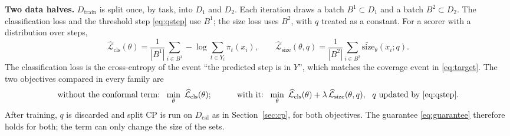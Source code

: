 \documentclass[10pt,a4paper]{article}
\newcommand{\Dtr}{D_{\mathrm{train}}}
\newcommand{\Dcal}{D_{\mathrm{cal}}}
\newcommand{\Lcls}{\widehat{\mathcal L}_{\mathrm{cls}}}
\newcommand{\Lsize}{\widehat{\mathcal L}_{\mathrm{size}}}
\newcommand{\cmt}[1]{\textcolor{purple}{[\textsc{Note:} #1}]}
\begin{document}
\textbf{Two data halves.} $\Dtr$ is split once, by task, into $D_1$ and $D_2$. Each iteration draws a batch $B^1\subset D_1$ and a batch $B^2\subset D_2$. The classification loss and the threshold step \eqref{eq:qstep} use $B^1$; the size loss uses $B^2$, with $q$ treated as a constant. For a scorer with a distribution over steps,
\begin{equation}
\Lcls(\theta)=\frac{1}{|B^1|}\sum_{i\in B^1}-\log\!\sum_{t\in Y_i}\pi_t(x_i),\qquad \Lsize(\theta,q)=\frac{1}{|B^2|}\sum_{i\in B^2}\widetilde{\mathrm{size}}_\theta(x_i;q). \label{eq:losses}
\end{equation}
The classification loss is the cross-entropy of the event ``the predicted step is in $Y$'', which matches the coverage event in \eqref{eq:target}. The two objectives compared in every family are
\begin{equation}
\text{without the conformal term:}\ \ \min_\theta\ \Lcls(\theta);\qquad\quad \text{with it:}\ \ \min_\theta\ \Lcls(\theta)+\lambda\,\Lsize(\theta,q),\ \ q\text{ updated by \eqref{eq:qstep}.} \label{eq:objectives}
\end{equation}
After training, $q$ is discarded and split CP is run on $\Dcal$ as in Section~\ref{sec:cp}, for both objectives. The guarantee \eqref{eq:guarantee} therefore holds for both; the term can only change the size of the sets.



\end{document}
